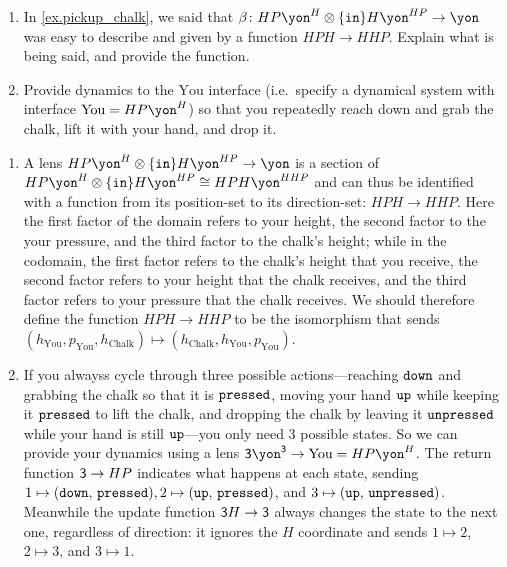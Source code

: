\documentclass[Book-Poly]{subfiles}
\begin{document}
\begin{exercise}\label{exc.pickup_chalk}
\begin{enumerate}
	\item In \cref{ex.pickup_chalk}, we said that $\beta\colon HP\yon^H\otimes \{\const{in}\}H\yon^{HP}\to\yon$ was easy to describe and given by a function $HPH\to HHP$. Explain what is being said, and provide the function.
	\item Provide dynamics to the $\text{You}$ interface (i.e.\ specify a dynamical system with interface $\text{You}=HP\yon^H$) so that you repeatedly reach down and grab the chalk, lift it with your hand, and drop it.
\qedhere
\end{enumerate}
\begin{solution}
\begin{enumerate}
    \item A lens $HP\yon^H\otimes \{\const{in}\}H\yon^{HP}\to\yon$ is a section of $HP\yon^H\otimes \{\const{in}\}H\yon^{HP}\iso HPH\yon^{HHP}$ and can thus be identified with a function from its position-set to its direction-set: $HPH\to HHP$.
    Here the first factor of the domain refers to your height, the second factor to the your pressure, and the third factor to the chalk's height; while in the codomain, the first factor refers to the chalk's height that you receive, the second factor refers to your height that the chalk receives, and the third factor refers to your pressure that the chalk receives.
    We should therefore define the function $HPH\to HHP$ to be the isomorphism that sends $(h_\text{You},p_\text{You},h_\text{Chalk})\mapsto(h_\text{Chalk},h_\text{You},p_\text{You})$.
    \item If you alwayss cycle through three possible actions---reaching $\texttt{down}$ and grabbing the chalk so that it is $\texttt{pressed}$, moving your hand $\texttt{up}$ while keeping it $\texttt{pressed}$ to lift the chalk, and dropping the chalk by leaving it $\texttt{unpressed}$ while your hand is still $\texttt{up}$---you only need $3$ possible states.
    So we can provide your dynamics using a lens $\3\yon^\3\to\text{You}=HP\yon^H$.
    The return function $\textsf{3}\to HP$ indicates what happens at each state, sending $1\mapsto(\texttt{down},\,\texttt{pressed}),2\mapsto(\texttt{up},\,\texttt{pressed})$, and $3\mapsto(\texttt{up},\,\texttt{unpressed})$.
    Meanwhile the update function $\textsf{3}H \to \textsf{3}$ always changes the state to the next one, regardless of direction: it ignores the $H$ coordinate and sends $1\mapsto2$, $2\mapsto3$, and $3\mapsto1$.
\end{enumerate}
\end{solution}
\end{exercise}
\end{document}

